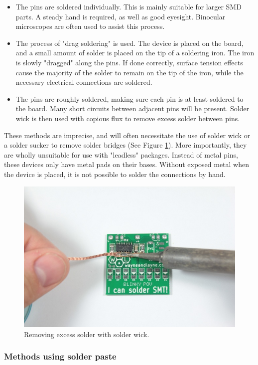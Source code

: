 \begin{itemize}
	\item	The pins are soldered individually. This is mainly suitable for larger SMD parts. A steady hand is required, as well as good eyesight.
			Binocular microscopes are often used to assist this process.
	\item	The process of "drag soldering" is used. The device is placed on the board, and a small amount of solder is placed on the tip of a soldering iron.
			The iron is slowly "dragged" along the pins. If done correctly, surface tension effects cause the majority of the solder to remain on the tip of the iron,
			while the necessary electrical connections are soldered.
	\item	The pins are roughly soldered, making sure each pin is at least soldered to the board. Many short circuits between adjacent pins will be present. Solder wick
			is then used with copious flux to remove excess solder between pins.
\end{itemize}

These methods are imprecise, and will often necessitate the use of solder wick or a solder sucker to remove solder bridges (See Figure \ref{handsolder}). More importantly, they are wholly unsuitable
for use with "leadless" packages. Instead of metal pins, these devices only have metal pads on their bases. Without exposed metal when the device is placed, it is not possible
to solder the connections by hand.

\begin{figure}[ht!]
\centering
\includegraphics[width=120mm]{resources/handsoldering.jpg}
\caption{Removing excess solder with solder wick.}
\label{handsolder}
\end{figure}

\subsubsection{Methods using solder paste}

